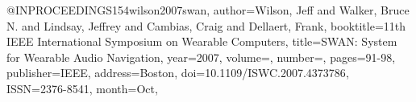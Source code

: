 @INPROCEEDINGS{154wilson2007swan,
author={Wilson, Jeff and Walker, Bruce N. and Lindsay, Jeffrey and Cambias, Craig and Dellaert, Frank},
booktitle={11th IEEE International Symposium on Wearable Computers}, 
title={SWAN: System for Wearable Audio Navigation}, 
year={2007},
volume={},
number={},
pages={91-98},
publisher={IEEE},
address={Boston},
doi={10.1109/ISWC.2007.4373786},
ISSN={2376-8541},
month={Oct},}